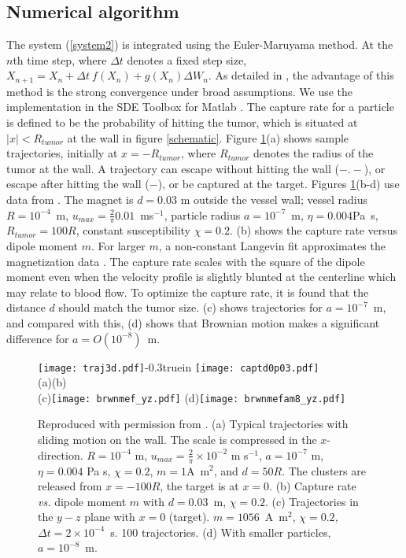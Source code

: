 \subsection{Numerical algorithm}
The system (\ref{system2})  is integrated using the Euler-Maruyama method. At the $n$th time step, where $\Delta t$ denotes a fixed step size, $X_{n+1}=X_n+\Delta t\ f(X_n)+g(X_n)\Delta W_n$.  As detailed in \cite{Higham2001},  the advantage of this method is the strong convergence under broad assumptions. We use the implementation 
in the SDE Toolbox for Matlab  \cite{Picchini}. 
The capture rate for a particle is defined to be the probability of hitting the tumor, which is situated  at $|x|<R_{tumor}$ at the wall in figure \ref{schematic}. 
Figure \ref{fig:3dtraj}(a) shows sample trajectories, initially at  $x=-R_{tumor}$, where $R_{tumor}$ denotes the radius of the tumor at the wall. A trajectory can escape without hitting the wall ($-.-$), or  escape after hitting the wall ($-$),  or be  captured at the target.  Figures   \ref{fig:3dtraj}(b-d) use data from \cite{ARRRP,House86}.  The magnet is $d=0.03$ m outside the vessel wall;  vessel radius $R=10^{-4}$~m, $u_{max}=\frac{2}{\pi} 0.01$~ms$^{-1}$, particle radius $a=10^{-7}$~m, $\eta= 0.004$Pa~s,  $R_{tumor}=100R$, constant susceptibility $\chi=0.2$.  
(b) shows the capture rate versus dipole moment $m$. For larger $m$, 
   a non-constant Langevin fit approximates the magnetization data  \cite{ARRRP}. The capture rate scales with the square of the dipole moment even when  the velocity profile is slightly blunted at the centerline which may relate to blood flow.  To optimize the capture rate, it is found that the distance $d$ should match the tumor size.   (c)  shows trajectories for $a=10^{-7}$~m, and compared with this, (d) shows that  Brownian motion makes a significant difference for    $a=O(10^{-8})$~m. 

\begin{figure}[t]
\texttt{[image: traj3d.pdf]}\hglue -0.3truein
\texttt{[image: captd0p03.pdf]}\hfil\\
\hfil (a)\hfil (b)\hfil\\
(c)\texttt{[image: brwnmef\_yz.pdf]}
(d)\texttt{[image: brwnmefam8\_yz.pdf]}\hfil\\
\caption{Reproduced with permission from \cite{YLAR2012}. (a) Typical  trajectories with sliding motion on the wall. The scale is  compressed in the $x$-direction.   $R=10^{-4}$ m, $u_{max}=\frac{2}{\pi}\times 10^{-2}$ m s$^{-1}$,  $a = 10^{-7}$ m, $\eta=0.004$ Pa s, 
$\chi=0.2$, $m=1$A~m$^2$, and $d=50 R$. The clusters are released from $x=-100R$, the target is at $x=0$. 
(b) Capture rate {\it vs.} dipole moment $m$ with $d=0.03$~m, $\chi=0.2$.
(c) Trajectories in the $y-z$ plane with $x=0$ (target). $m=1056$~A~m$^2$, $\chi=0.2$, $\Delta t=2\times 
 10^{-4}$~s. 100 trajectories.
(d)  With smaller particles,  $a=10^{-8}$~m. }\label{fig:3dtraj}
\end{figure}






